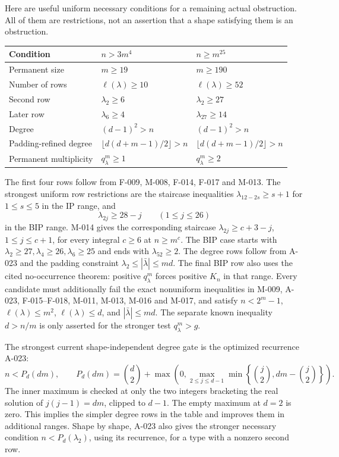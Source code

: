 Here are useful uniform necessary conditions for a remaining
actual obstruction. All of them are restrictions, not an
assertion that a shape satisfying them is an obstruction.
\begin{center}
\renewcommand{\arraystretch}{1.2}
\begin{tabular}{@{}p{}p{}p{}@{}}
\toprule
Condition & \(n>3m^4\) & \(n\geq m^{25}\)\\
\midrule
Permanent size & \(m\geq19\) & \(m\geq190\)\\
Number of rows & \(\ell(\lambda)\geq10\) & \(\ell(\lambda)\geq52\)\\
Second row & \(\lambda_2\geq6\) & \(\lambda_2\geq27\)\\
Later row & \(\lambda_6\geq4\) & \(\lambda_{27}\geq14\)\\
Degree & \((d-1)^2>n\) & \((d-1)^2>n\)\\
Padding-refined degree & \(\lfloor d(d+m-1)/2\rfloor>n\) & \(\lfloor d(d+m-1)/2\rfloor>n\)\\
Permanent multiplicity & \(q^m_\lambda\geq1\) & \(q^m_\lambda\geq2\)\\
\bottomrule
\end{tabular}
\end{center}
The first four rows follow from F-009, M-008, F-014, F-017 and M-013.
The strongest uniform row restrictions are the staircase inequalities
\(\lambda_{12-2s}\geq s+1\) for \(1\leq s\leq5\) in
the IP range, and
\[
                  \lambda_{2j}\geq28-j\qquad(1\leq j\leq26)
\]
in the BIP range. M-014 gives the corresponding staircase
\(\lambda_{2j}\geq c+3-j\), \(1\leq j\leq c+1\),
for every integral \(c\geq6\) at \(n\geq m^c\).
The BIP case starts with
\(\lambda_2\geq27,\lambda_4\geq26,\lambda_6\geq25\)
and ends with \(\lambda_{52}\geq2\). The degree rows follow
from A-023 and the padding constraint
\(\lambda_2\leq|\bar\lambda|\leq md\). The final BIP
row also uses the cited no-occurrence theorem: positive
\(q^m_\lambda\) forces positive \(K_n\) in that range.
Every candidate must additionally fail the exact nonuniform
inequalities in M-009, A-023, F-015--F-018, M-011, M-013, M-016 and M-017,
and satisfy \(n<2^m-1\), \(\ell(\lambda)\leq m^2\),
\(\ell(\lambda)\leq d\), and \(|\bar\lambda|\leq md\).
The separate known inequality \(d>n/m\) is only asserted
for the stronger test \(q^m_\lambda>g\).

The strongest current shape-independent degree gate is the optimized
recurrence A-023:
\[
 n<P_d(dm),\qquad
 P_d(dm)=\binom d2+
 \max\!\left(0,\max_{2\leq j\leq d-1}
       \min\left\{\binom j2,dm-\binom j2\right\}\right).
\]
The inner maximum is checked at only the two integers bracketing
the real solution of \(j(j-1)=dm\), clipped to \(d-1\).
The empty maximum at \(d=2\) is zero. This implies the simpler
degree rows in the table and improves them in additional ranges.
Shape by shape, A-023 also gives the stronger necessary condition
\(n<P_d(\lambda_2)\), using its recurrence, for a type with a
nonzero second row.

